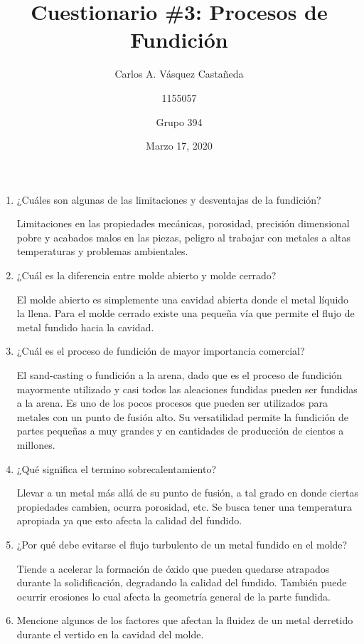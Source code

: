 \documentclass[12pt, letterpaper]{article}
\title{Cuestionario \#3: Procesos de Fundición}
\author{Carlos A. Vásquez Castañeda \and 1155057 \and Grupo 394}
\date{Marzo 17, 2020}
\begin{document}
\maketitle

\begin{enumerate}
	\item ¿Cuáles son algunas de las limitaciones y desventajas de la fundición?

		Limitaciones en las propiedades mecánicas, porosidad, precisión dimensional pobre y acabados malos en las piezas, peligro al trabajar con metales a altas temperaturas y problemas ambientales.

	\item ¿Cuál es la diferencia entre molde abierto y molde cerrado?

		El molde abierto es simplemente una cavidad abierta donde el metal líquido la llena. Para el molde cerrado existe una pequeña vía que permite el flujo de metal fundido hacia la cavidad.

	\item ¿Cuál es el proceso de fundición de mayor importancia comercial?

		El sand-casting o fundición a la arena, dado que es el proceso de fundición mayormente utilizado y casi todos las aleaciones fundidas pueden ser fundidas a la arena. Es uno de los pocos procesos que pueden ser utilizados para metales con un punto de fusión alto. Su versatilidad permite la fundición de partes pequeñas a muy grandes y en cantidades de producción de cientos a millones.

	\item ¿Qué significa el termino sobrecalentamiento?

		Llevar a un metal más allá de su punto de fusión, a tal grado en donde ciertas propiedades cambien, ocurra porosidad, etc. Se busca tener una temperatura apropiada ya que esto afecta la calidad del fundido.

	\item ¿Por qué debe evitarse el flujo turbulento de un metal fundido en el molde?
		
		Tiende a acelerar la formación de óxido que pueden quedarse atrapados durante la solidificación, degradando la calidad del fundido. También puede ocurrir erosiones lo cual afecta la geometría general de la parte fundida.

	\item Mencione algunos de los factores que afectan la fluidez de un metal derretido durante el vertido en la cavidad del molde.


\end{enumerate}
\end{document}
